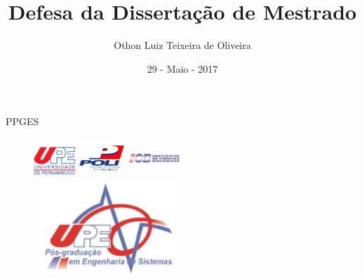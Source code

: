 \documentclass[11pt]{beamer}
\author{ Othon Luiz Teixeira de Oliveira }
\title[PPGES]{Defesa da Dissertação de Mestrado}
\institute{Escola Politécnica de Pernambuco -- Poli ---  UPE}
\date{29 - Maio - 2017}
\begin{document}
\begin{frame}
	\titlepage
\end{frame}

\newcommand{\capa}{
    \begin{tikzpicture}[remember picture,overlay]
        \node at (current page.south west)
            {\begin{tikzpicture}[remember picture, overlay]
                \fill[shading=radial,top color=orange,bottom color=orange,middle color=yellow] (0,0) rectangle (\paperwidth,\paperheight);
            \end{tikzpicture}
          };
    \end{tikzpicture}
}

\begin{frame}{PPGES}
	\begin{figure}[h]
		\includegraphics[width=16mm, height=13mm]{Figuras/Capa/upelogo.eps}
		\qquad \quad \quad \quad \quad
		\includegraphics[width=17mm, height=15mm]{Figuras/Capa/logoPoli.jpg}
		\qquad \quad \quad \quad \quad \quad \quad 	\vspace{0.5in}
		\includegraphics[width=20mm, height=15mm]{Figuras/Capa/icblogo.png}
		\\
		\includegraphics[width=55mm, height=35mm]{Figuras/Capa/logo_ppges3.png}
		
	\end{figure}
\end{frame}
\end{document}
